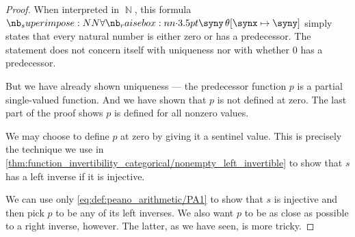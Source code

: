 \begin{proof}
  When interpreted in \( \BbbN \), this formula \( \qforall \syny \theta[\synx \mapsto \syny] \) simply states that every natural number is either zero or has a predecessor. The statement does not concern itself with uniqueness nor with whether \( 0 \) has a predecessor.

  But we have already shown uniqueness --- the predecessor function \( p \) is a partial single-valued function. And we have shown that \( p \) is not defined at zero. The last part of the proof shows \( p \) is defined for all nonzero values.

  We may choose to define \( p \) at zero by giving it a sentinel value. This is precisely the technique we use in \cref{thm:function_invertibility_categorical/nonempty_left_invertible} to show that \( s \) has a left inverse if it is injective.

  We can use only \eqref{eq:def:peano_arithmetic/PA1} to show that \( s \) is injective and then pick \( p \) to be any of its left inverses. We also want \( p \) to be as close as possible to a right inverse, however. The latter, as we have seen, is more tricky.
\end{proof}

